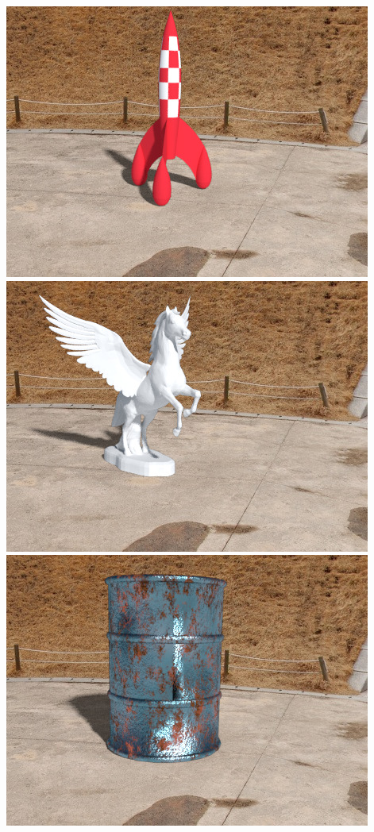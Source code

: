 \begin{multicols}{3}
\includegraphics[width=\linewidth]{virtual_object_insertions/pano_abpebgbgmpccye-6_0_es.jpg}\vspace{1em}
\includegraphics[width=\linewidth]{virtual_object_insertions/pano_abpebgbgmpccye-6_1_es.jpg}\vspace{1em}
\includegraphics[width=\linewidth]{virtual_object_insertions/pano_abpebgbgmpccye-6_4_es.jpg}\vspace{1em}

\end{multicols}
